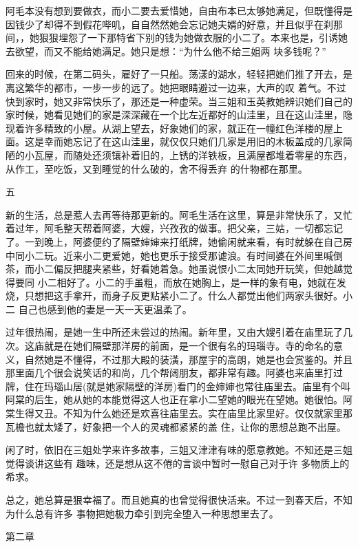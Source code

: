 \documentclass{article}
\begin{document}
阿毛本没有想到要做衣，而小二要去爱惜她，自由布本已太够她满足，但既懂得是因钱少了却得不到假花哔叽，自自然然她会忘记她夫婿的好意，并且似乎在刹那间，，她狠狠埋怨了一下那特省下别的钱为她做衣服的小二了。本来也是，引诱她去欲望，而又不能给她满足。她只是想：“为什么他不给三姐两
块多钱呢？” 

回来的时候，在第二码头，雇好了一只船。荡漾的湖水，轻轻把她们推了开去，是离这繁华的都市，一步一步的远了。她把眼睛避过一边来，大声的叹
\newpage
着气。不过快到家时，她又非常快乐了，那还是一种虚荣。当三姐和玉英教她辨识她们自己的家时候，她看见她们的家是深深藏在一个比左近都好的山洼里，且在这山洼里，隐现着许多精致的小屋。从湖上望去，好象她们的家，就正在一幢红色洋楼的屋上面。这是幸而她忘记了在这山洼里，就仅仅只她们几家是用旧的木板盖成的几家简陋的小瓦屋，而随处还须镶补着旧的，上锈的洋铁板，且满屋都堆着零星的东西，从作工，至吃饭，又到睡觉的什么破的，舍不得丢弃
的什物都在那里。 


五 

新的生活，总是惹人去再等待那更新的。阿毛生活在这里，算是非常快乐了，又忙着过年，阿毛整天帮着阿婆，大嫂，兴孜孜的做事。把父亲，三姑，一切都忘记了。一到晚上，阿婆便约了隔壁婶婶来打纸牌，她偷闲就来看，有时就躲在自己房中同小二玩。近来小二更爱她，她也更乐于接受那谑浪。有时间婆在外间里喊倒茶，而小二偏反把腿夹紧些，好看她着急。她虽说恨小二太同她开玩笑，但她越觉得要同
\newpage
小二相好了。小二的手虽粗，而放在她胸上，是一样的象有电，她就在发烧，只想把这手拿开，而身子反更贴紧小二了。什么人都觉出他们两家头很好。小二
自己也感到他的妻是一天一天更温柔了。 

过年很热闹，是她一生中所还未尝过的热闹。新年里，又由大嫂引着在庙里玩了几次。这庙就是在她们隔壁那洋房的前面，是一个很有名的玛瑙寺。寺的命名的意义，自然她是不懂得，不过那大殿的装潢，那屋宇的高朗，她是也会赏鉴的。并且那里面几个很会说笑话的和尚，几个帮阔朋友，都非常有趣。阿婆也来庙里打过牌，住在玛瑙山居(就是她家隔壁的洋房)看门的金婶婶也常往庙里去。庙里有个叫阿棠的后生，她从她的本能觉得这人也正在拿小二望她的眼光在望她。她很怕。阿棠生得又丑。不知为什么她还是欢喜往庙里去。实在庙里比家里好。仅仅就家里那瓦檐也就太矮了，好象把一个人的灵魂都紧紧的盖
住，让你的思想总跑不出屋。 

闲了时，依旧在三姐处学来许多故事，三姐又津津有味的愿意教她。不知还是三姐觉得谈讲这些有
\newpage
趣味，还是想从这不倦的言谈中暂时一慰自己对于许
多物质上的希求。 

总之，她总算是狠幸福了。而且她真的也曾觉得很快活来。不过一到春天后，不知为什么总有许多
事物把她极力牵引到完全堕入一种思想里去了。 


第二章 
\end{document}
